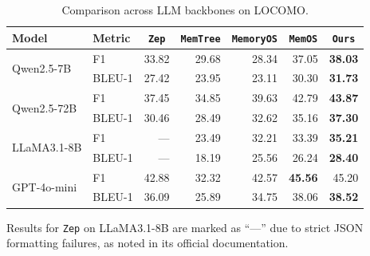 \begin{table}[]
    \centering
    \caption{Comparison across LLM backbones on LOCOMO.}
    \label{tab:model}
    \small
    \setlength{\tabcolsep}{4pt}
    \begin{threeparttable}
        \begin{tabular}{l|l|r|r|r|r|r}
        \toprule
        \textbf{Model} & Metric & \multicolumn{1}{c|}{\texttt{Zep}} & \multicolumn{1}{c|}{\texttt{MemTree}} & \multicolumn{1}{c|}{\texttt{MemoryOS}} & \multicolumn{1}{c|}{\texttt{MemOS}} & \multicolumn{1}{c}{\texttt{Ours}} \\
        \midrule
        \multirow{2}{*}{Qwen2.5-7B}
          & F1    & 33.82 & 29.68 & 28.34 & 37.05 & \textbf{38.03} \\
          & BLEU-1 & 27.42 & 23.95 & 23.11 & 30.30 & \textbf{31.73} \\
        \midrule
        \multirow{2}{*}{Qwen2.5-72B}
          & F1    & 37.45 & 34.85 & 39.63 & 42.79 & \textbf{43.87} \\
          & BLEU-1 & 30.46 & 28.49 & 32.62 & 35.16 & \textbf{37.30} \\
        \midrule
        \multirow{2}{*}{LLaMA3.1-8B}
          & F1    & ---     & 23.49 & 32.21 & 33.39 & \textbf{35.21} \\
          & BLEU-1 & ---     & 18.19 & 25.56 & 26.24 & \textbf{28.40} \\
        \midrule
        \multirow{2}{*}{GPT-4o-mini}
          & F1    & 42.88 & 32.32 & 42.57 & \textbf{45.56} & 45.20 \\
          & BLEU-1 & 36.09 & 25.89 & 34.75 & 38.06 & \textbf{38.52} \\
        \bottomrule
        \end{tabular}

        \begin{tablenotes}[flushleft]
            \small
            \item[$\dagger$]Results for \texttt{Zep} on LLaMA3.1-8B are marked as ``---'' due to strict JSON formatting failures, as noted in its official documentation\footnotemark.
        \end{tablenotes}
    \end{threeparttable}
\end{table}



